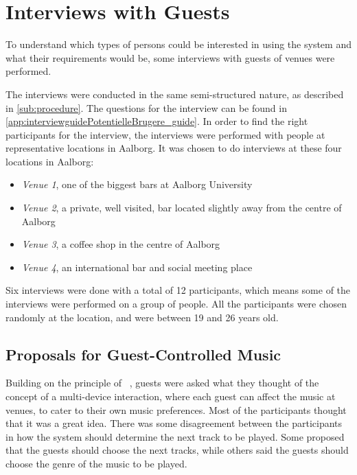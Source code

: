 \section{Interviews with Guests}
\label{userInterviews}

To understand which types of persons could be interested in using the system and what their requirements would be, some interviews with guests of venues were performed.

The interviews were conducted in the same semi-structured nature, as described in \cref{sub:procedure}. The questions for the interview can be found in \cref{app:interviewguidePotentielleBrugere_guide}. In order to find the right participants for the interview, the interviews were performed with people at representative locations in Aalborg. It was chosen to do interviews at these four locations in Aalborg:

\begin{itemize}
    \item \emph{Venue 1}, one of the biggest bars at Aalborg University
    \item \emph{Venue 2}, a private, well visited, bar located slightly away from the centre of Aalborg
    \item \emph{Venue 3}, a coffee shop in the centre of Aalborg
    \item \emph{Venue 4}, an international bar and social meeting place
\end{itemize}

Six interviews were done with a total of 12 participants, which means
some of the interviews were performed on a group of people. All the
participants were chosen randomly at the location, and were between 19 and 26 years old.

\subsection{Proposals for Guest-Controlled Music}
\label{ProposalsForGuestControlledMusic}
Building on the principle of ~\cite{sorensen2012}, guests were asked what they thought of the concept of a multi-device interaction, where each guest can affect the music at venues, to cater to their own music preferences. Most of the participants thought that it was a great idea. There was some disagreement between the participants in how the system should determine the next track to be played. Some proposed that the guests should choose the next tracks, while others said the guests should choose the genre of the music to be played.

